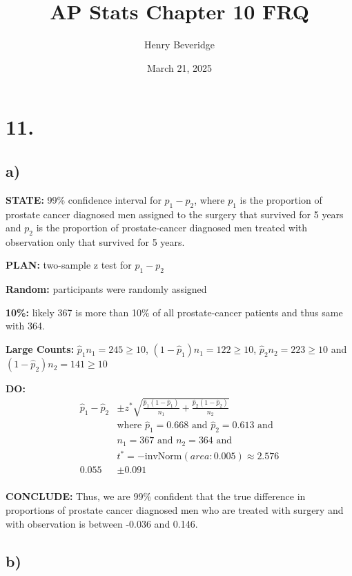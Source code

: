 \documentclass{article}
\title{AP Stats Chapter 10 FRQ}
\author{Henry Beveridge}
\date{March 21, 2025}
\begin{document}
\maketitle

\section*{11.}

\subsection*{a)}

\textbf{STATE:} 99\% confidence interval for $p_1-p_2$, where $p_1$ is the proportion of prostate cancer diagnosed men assigned to the surgery that survived 
for 5 years and $p_2$ is the proportion of prostate-cancer diagnosed men treated with observation only that survived for 5 years.

\noindent\textbf{PLAN:} two-sample z test for $p_1 - p_2$

    \textbf{Random:} participants were randomly assigned

    \textbf{10\%:} likely 367 is more than 10\% of all prostate-cancer patients and thus same with 364.

    \textbf{Large Counts:} $\hat{p}_1n_1 = 245 \ge 10$, $(1-\hat{p}_1)n_1 = 122 \ge 10$, $\hat{p}_2n_2 = 223 \ge 10$ and $(1-\hat{p}_2)n_2 = 141 \ge 10$

\noindent\textbf{DO:}
\begin{align*}
  \hat{p}_1 - \hat{p}_2 &\pm z^* \sqrt{\frac{\hat{p}_1(1-\hat{p}_1)}{n_1}+\frac{\hat{p}_2(1-\hat{p}_2)}{n_2}} \\
  & \text{where } \hat{p}_1 = 0.668 \text{ and } \hat{p}_2 = 0.613 \text{ and} \\
  & n_1 = 367 \text{ and } n_2 = 364 \text{ and} \\
  & t^* = -\text{invNorm}(area:0.005) \approx 2.576 \\
  0.055 &\pm 0.091 \\
\end{align*}

\noindent\textbf{CONCLUDE:} Thus, we are 99\% confident that the true difference in proportions
of prostate cancer diagnosed men who are treated with surgery and with observation is between -0.036 and 0.146.

\subsection*{b)}
\end{document}
